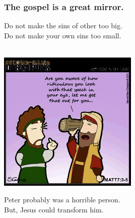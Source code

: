 \documentclass{beamer}
\begin{document}
\begin{frame}
\frametitle{The gospel is a great mirror.}
Do not make the sins of other too big.\\
Do not make your own sins too small.\\~\\
\begin{center}
\includegraphics[width=0.5\textwidth]{graphics/beam.jpg}\\
\end{center}
Peter probably was a horrible person.\\
But, Jesus could transform him.
\end{frame}
\end{document}
